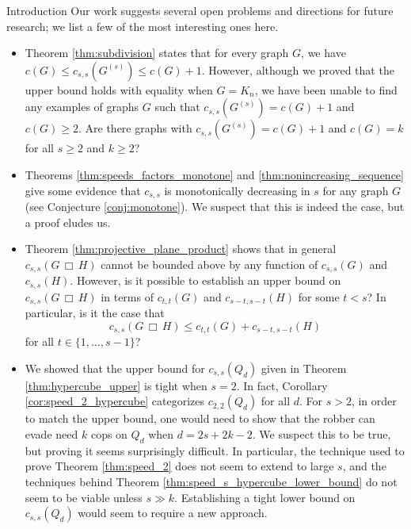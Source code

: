 \documentclass[12pt]{amsart}
\newcommand{\comment}[1]{\textcolor{red}{#1}}
\theoremstyle{definition}
\def\cart{\, \Box \,}
\newcommand{\speeds}{c_{s,s}}
\newcommand{\speed}[1]{c_{#1,#1}}
\begin{document}
\begin{section}{Introduction}
Our work suggests several open problems and directions for future research; we list a few of the most interesting ones here.\\

\begin{itemize}
\item Theorem \ref{thm:subdivision} states that for every graph $G$, we have $c(G) \le \speeds(G^{(s)}) \le c(G)+1$.  However, although we proved that the upper bound holds with equality when $G=K_n$, we have been unable to find any examples of graphs $G$ such that $c_{s,s}(G^{(s)})=c(G)+1$ and $c(G)\ge 2$.  Are there graphs with $\speeds(G^{(s)}) = c(G)+1$ and $c(G) = k$ for all $s \ge 2$ and $k \ge 2$?\\  %

\item Theorems \ref{thm:speeds_factors_monotone} and \ref{thm:nonincreasing_sequence} give some evidence that $c_{s,s}$ is monotonically decreasing in $s$ for any graph $G$ (see Conjecture \ref{conj:monotone}).  We suspect that this is indeed the case, but a proof eludes us.\\

\item Theorem \ref{thm:projective_plane_product} shows that in general $\speeds(G\cart H)$ cannot be bounded above by any function of $\speeds(G)$ and $\speeds(H)$.  However, is it possible to establish an upper bound on $\speed{s}(G \cart H)$ in terms of $\speed{t}(G)$ and $\speed{s-t}(H)$ for some $t < s$?  In particular, is it the case that
$$\speed{s}(G \cart H) \le \speed{t}(G) + \speed{s-t}(H)$$
for all $t \in \{1, \dots, s-1\}$?\\

\item We showed that the upper bound for $c_{s,s}(Q_d)$ given in Theorem \ref{thm:hypercube_upper} is tight when $s=2$.  In fact, Corollary \ref{cor:speed_2_hypercube} categorizes $c_{2,2}(Q_d)$ for all $d$.  For $s>2$, in order to match the upper bound, one would need to show that the robber can evade need $k$ cops on $Q_d$ when $d=2s+2k-2$.  We suspect this to be true, but proving it seems surprisingly difficult.  In particular, the technique used to prove Theorem \ref{thm:speed_2} does not seem to extend to large $s$, and the techniques behind Theorem \ref{thm:speed_s_hypercube_lower_bound} do not seem to be viable unless $s \gg k$.  Establishing a tight lower bound on $\speed{s}(Q_d)$ would seem to require a new approach.\\


\end{itemize}
\end{section}
\end{document}
